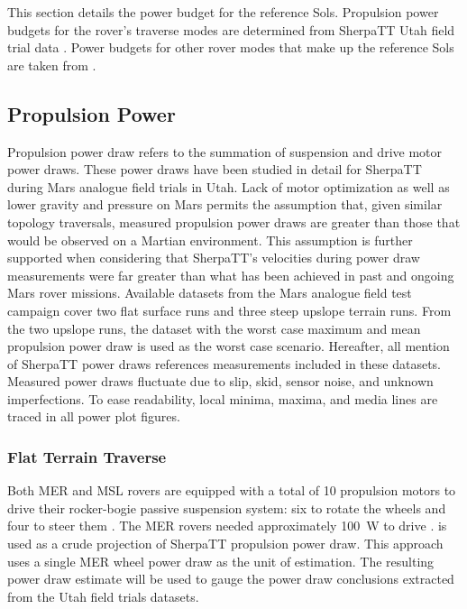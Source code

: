 This section details the power budget for the reference Sols. Propulsion power budgets for the rover's traverse modes are determined from SherpaTT Utah field trial data . Power budgets for other rover modes that make up the reference Sols are taken from .

\subsection{Propulsion Power}
\label{sec:PowerBudget:PropulsionPowerBudget}
Propulsion power draw refers to the summation of suspension and drive motor power draws. These power draws have been studied in detail for SherpaTT during Mars analogue field trials in Utah. Lack of motor optimization as well as lower gravity and pressure on Mars permits the assumption that, given similar topology traversals, measured propulsion power draws are greater than those that would be observed on a Martian environment. This assumption is further supported when considering that SherpaTT's velocities during power draw measurements were far greater than what has been achieved in past and ongoing Mars rover missions. Available datasets from the Mars analogue field test campaign cover two flat surface runs and three steep upslope terrain runs. From the two upslope runs, the dataset with the worst case maximum and mean propulsion power draw is used as the worst case scenario. Hereafter, all mention of SherpaTT power draws references measurements included in these datasets. Measured power draws fluctuate due to slip, skid, sensor noise, and unknown imperfections. To ease readability, local minima, maxima, and media lines are traced in all power plot figures.

\subsubsection{Flat Terrain Traverse}
\label{sec:PowerBudget:PropulsionPowerBudget:FlatTerrainTraverse}
Both \ac{MER} and \ac{MSL} rovers are equipped with a total of 10 propulsion motors to drive their rocker-bogie passive suspension system: six to rotate the wheels and four to steer them  . The \ac{MER} rovers needed approximately \SI{100}{\watt} to drive .  is used as a crude projection of SherpaTT propulsion power draw. This approach uses a single \ac{MER} wheel power draw as the unit of estimation. The resulting power draw estimate will be used to gauge the power draw conclusions extracted from the Utah field trials datasets.

